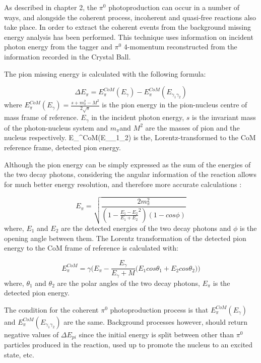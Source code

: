 \indent As described in chapter 2, the $\pi^{0}$ photoproduction can occur in a number of ways, and alongside the coherent process, incoherent and quasi-free reactions also take place. In order to extract the coherent events from the background missing energy analysis has been performed. This technique uses information on incident photon energy from the tagger and $\pi^{0}$ 4-momentum reconstructed from the information recorded in the Crystal Ball.

\indent The pion missing energy is calculated with the following formula:

\begin{equation}
\Delta E_{\pi} = E_{\pi}^{CoM}(E_{\gamma})-E_{\pi}^{CoM}(E_{\gamma_{1}\gamma_{2}})
\end{equation}
where $E_{\pi}^{CoM}(E_{\gamma})=\frac{s+m_{\pi}^{2}-M^{2}}{2\sqrt{s}}$ is the pion energy in the pion-nucleus centre of mass frame of reference. $E_{\gamma}$ in the incident photon energy, $s$ is the invariant mass of the photon-nucleus system and $m_{\pi}$and $M^{2}$ are the masses of pion  and the nucleus respectively. E_{\pi}^{CoM}(E_{\gamma_{1}\gamma_{2}}) is the, Lorentz-transformed to the CoM reference frame, detected pion energy.

\indent Although the pion energy can be simply expressed as the sum of the energies of the two decay photons, considering the angular information of the reaction allows for much better energy resolution, and therefore more accurate calculations \cite{miller}:

\begin{equation}
E_{\pi} = \sqrt{\frac{2m_{\pi}^{2}}{(1-\frac{E_{1}-E_{2}}{E_{1}+E_{2}}^{2})(1-cos\phi)}}
\end{equation}
where, $E_{1}$ and $E_{2}$ are the detected energies of the two decay photons and $\phi$ is the opening angle between them. The Lorentz transformation of the detected pion energy to the CoM frame of reference is calculated with:

\begin{equation}
E_{\pi}^{CoM} = \gamma\Big(E_{\pi}-\frac{E_{\gamma}}{E_{\gamma}+M}\big(E_{1}cos\theta_{1}+E_{2}cos\theta_{2}\big)\Big)
\end{equation}
where, $\theta_{1}$ and $\theta_{2}$ are the polar angles of the two decay photons, $E_{\pi}$ is the detected pion energy.

\indent The condition for the coherent $\pi^{0}$ photoproduction process is that $E_{\pi}^{CoM}(E_{\gamma})$ and $E_{\pi}^{CoM}(E_{\gamma_{1}\gamma_{2}})$ are the same. Background processes however, should return negative values of $\Delta E_{pi}$ since the initial energy is split between other than $\pi^{0}$ particles produced in the reaction, used up to promote the nucleus to an excited state, etc.

